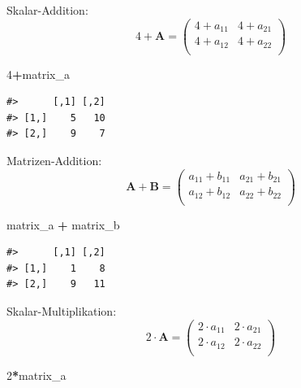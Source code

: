 \documentclass[]{book}
\newenvironment{Shaded}{\begin{snugshade}}{\end{snugshade}}
\newcommand{\DecValTok}[1]{\textcolor[rgb]{0.00,0.00,0.81}{#1}}
\newcommand{\StringTok}[1]{\textcolor[rgb]{0.31,0.60,0.02}{#1}}
\newcommand{\OperatorTok}[1]{\textcolor[rgb]{0.81,0.36,0.00}{\textbf{#1}}}
\newcommand{\NormalTok}[1]{#1}
\begin{document}
Skalar-Addition: \[4+\boldsymbol{A}=
\left( 
\begin{array}{rrr}                                
4+a_{11} & 4+a_{21} \\                                               
4+a_{12} & 4+a_{22} \\                                               
\end{array}
\right)\]

\begin{Shaded}
\begin{Highlighting}[]
\DecValTok{4}\OperatorTok{+}\NormalTok{matrix_a}
\end{Highlighting}
\end{Shaded}

\begin{verbatim}
#>      [,1] [,2]
#> [1,]    5   10
#> [2,]    9    7
\end{verbatim}

Matrizen-Addition: \[\boldsymbol{A}+\boldsymbol{B}=
\left(
\begin{array}{rrr}                                
a_{11} + b_{11} & a_{21} + b_{21}\\                                               
a_{12} + b_{12} & a_{22} + b_{22}\\                                               
\end{array}
\right)\]

\begin{Shaded}
\begin{Highlighting}[]
\NormalTok{matrix_a }\OperatorTok{+}\StringTok{ }\NormalTok{matrix_b}
\end{Highlighting}
\end{Shaded}

\begin{verbatim}
#>      [,1] [,2]
#> [1,]    1    8
#> [2,]    9   11
\end{verbatim}

Skalar-Multiplikation: \[2\cdot\boldsymbol{A}=
\left( 
\begin{array}{rrr}                                
2\cdot a_{11} & 2\cdot a_{21} \\                                               
2\cdot a_{12} & 2\cdot a_{22} \\                                               
\end{array}
\right)\]

\begin{Shaded}
\begin{Highlighting}[]
\DecValTok{2}\OperatorTok{*}\NormalTok{matrix_a}
\end{Highlighting}
\end{Shaded}
\end{document}
